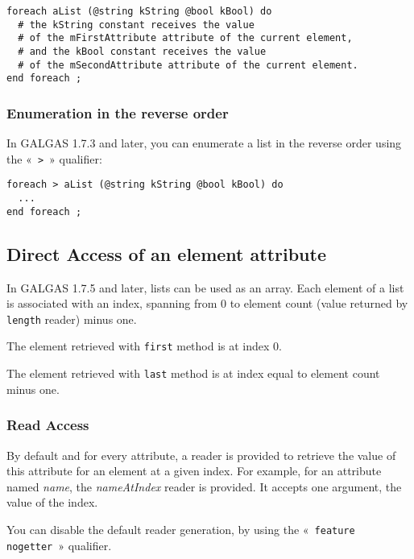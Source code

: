 \begin{lstlisting}[language=galgas]
foreach aList (@string kString @bool kBool) do
  # the kString constant receives the value
  # of the mFirstAttribute attribute of the current element,
  # and the kBool constant receives the value
  # of the mSecondAttribute attribute of the current element.
end foreach ;
\end{lstlisting}

\subsubsection{Enumeration in the reverse order}

In GALGAS 1.7.3 and later, you can enumerate a list in the reverse order using the «~\lstinline[language=galgas]!>!~» qualifier:

\begin{lstlisting}[language=galgas]
foreach > aList (@string kString @bool kBool) do
  ...
end foreach ;
\end{lstlisting}




\subsection{Direct Access of an element attribute}

In GALGAS 1.7.5 and later, lists can be used as an array. Each element of a list is associated with an  index, spanning from 0 to element count (value returned by \lstinline[language=galgas]!length! reader) minus one.

The element retrieved with \lstinline[language=galgas]!first! method is at index 0.

The element retrieved with \lstinline[language=galgas]!last! method is at index equal to element count minus one.

\subsubsection{Read Access}

By default and for every attribute, a reader is provided to retrieve the value of this attribute for an element at a given index. For example, for an attribute named \emph{name}, the \emph{nameAtIndex} reader is provided. It accepts one  argument, the value of the index.

You can disable the default reader generation, by using the «~\lstinline[language=galgas]!feature nogetter!~» qualifier.

